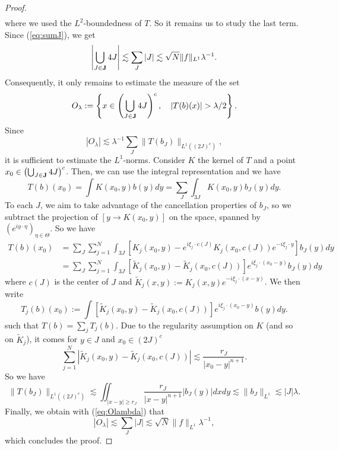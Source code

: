 \documentclass[11pt]{amsart}
\theoremstyle{remark}
\begin{document}
\begin{proof}
\begin{align*}
\end{align*}
where we used the $L^2$-boundedness of $T$. So it remains us to study the last term.
Since (\ref{eq:sumJ}), we get
$$ \left| \bigcup_{J\in {\bf J}} 4J \right| \lesssim \sum_{J} |J| \lesssim  \sqrt{N} \|f\|_{L^1} \lambda^{-1}.$$
Consequently, it only remains to estimate the measure of the set
$$ O_\lambda:= \left\{x \in \left(\bigcup_{J\in {\bf J}} 4J\right)^{c}, \quad |T(b)(x)|>\lambda/2\right\}.$$
Since
\begin{equation} 
 |O_\lambda| \lesssim \lambda^{-1} \sum_{J} \|T(b_J)\|_{L^1((2J)^c)}, \label{eq:Olambda}
\end{equation}
it is sufficient to estimate the $L^1$-norms.
Consider $K$ the kernel of $T$ and a point $x_0\in \left(\bigcup_{J\in {\bf J}} 4J\right)^{c}$.
Then, we can use the integral representation and we have
$$ T(b)(x_0) = \int K(x_0,y) b(y) dy = \sum_{J} \int_{3J} K(x_0,y) b_J(y) dy.$$
To each $J$, we aim to take advantage of the cancellation properties of $b_J$, so we subtract the projection of $\left[y\to K(x_0,y)\right]$ on the space, spanned by $(e^{iy\cdot\eta})_{\eta\in \Theta}$. So we have
\begin{align*}
 T(b)(x_0) & = \sum_{J}\sum_{j=1}^N  \int_{3J} \left[K_j(x_0,y) - e^{i\xi_j \cdot c(J)} K_j(x_0,c(J))e^{-i\xi_j \cdot y}\right] b_J(y) dy \\
 & = \sum_{J}\sum_{j=1}^N  \int_{3J} \left[\widetilde{K}_{j}(x_0,y) - \widetilde{K}_j(x_0,c(J))\right]e^{i\xi_j\cdot (x_0-y)} b_J(y) dy
\end{align*}
where $c(J)$ is the center of $J$ and $\widetilde{K}_j(x,y):=K_j(x,y)e^{-i\xi_j \cdot (x-y)}$.
We then write 
$$ T_j(b)(x_0) :=  \int \left[\widetilde{K}_{j}(x_0,y) - \widetilde{K}_j(x_0,c(J))\right]e^{i\xi_j \cdot (x_0-y)} b(y) dy.$$
such that $T(b) =\sum_j T_j(b)$. Due to the regularity assumption on $K$ (and so on $\widetilde{K}_j$), it comes for $y\in J$ and $x_0\in (2J)^c$
\begin{equation} 
\sum_{j=1}^N \left|\widetilde{K}_{j}(x_0,y) - \widetilde{K}_j(x_0,c(J))\right| \lesssim \frac{r_J}{|x_0-y|^{n+1}}. \label{eq:kernelbis} \end{equation}
So we have
$$ \|T(b_J)\|_{L^1((2J)^c)} \lesssim \iint_{|x-y|\geq r_J} \frac{r_J}{|x-y|^{n+1}} |b_J(y)| dxdy \lesssim \|b_J\|_{L^1} \lesssim |J| \lambda.$$
Finally, we obtain with (\ref{eq:Olambda}) that
$$ |O_\lambda| \lesssim \sum_{J} |J| \lesssim  \sqrt{N} \|f\|_{L^1} \lambda^{-1}, $$
which concludes the proof.
\end{proof}
\end{document}
